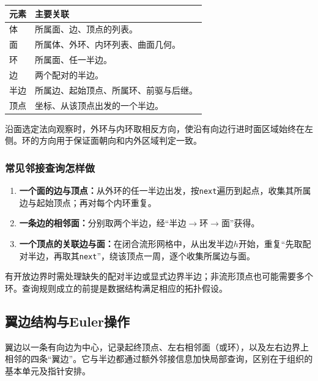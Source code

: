 \begin{center}
\renewcommand{\arraystretch}{1.25}
\begin{tabularx}{\linewidth}{lX}
\toprule
元素 & 主要关联 \\
\midrule
体 & 所属面、边、顶点的列表。 \\
面 & 所属体、外环、内环列表、曲面几何。 \\
环 & 所属面、任一半边。 \\
边 & 两个配对的半边。 \\
半边 & 所属边、起始顶点、所属环、前驱与后继。 \\
顶点 & 坐标、从该顶点出发的一个半边。 \\
\bottomrule
\end{tabularx}
\end{center}


沿面选定法向观察时，外环与内环取相反方向，使沿有向边行进时面区域始终在左侧。环的方向用于保证面朝向和内外区域判定一致。

\subsubsection*{常见邻接查询怎样做}
\begin{enumerate}
\item \textbf{一个面的边与顶点：}从外环的任一半边出发，按\texttt{next}遍历到起点，收集其所属边与起始顶点；再对每个内环重复。
\item \textbf{一条边的相邻面：}分别取两个半边，经“半边$\to$环$\to$面”获得。
\item \textbf{一个顶点的关联边与面：}在闭合流形网格中，从出发半边$h$开始，重复“先取配对半边，再取其\texttt{next}”，绕该顶点一周，逐个收集所属边与面。
\end{enumerate}
有开放边界时需处理缺失的配对半边或显式边界半边；非流形顶点也可能需要多个环。查询规则成立的前提是数据结构满足相应的拓扑假设。

\subsection{翼边结构与Euler操作}
翼边以一条有向边为中心，记录起终顶点、左右相邻面（或环），以及左右边界上相邻的四条“翼边”。它与半边都通过额外邻接信息加快局部查询，区别在于组织的基本单元及指针安排。


